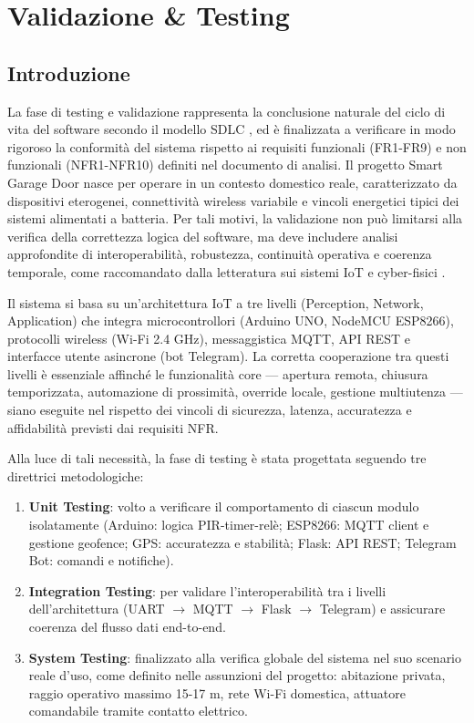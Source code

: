 \chapter{Validazione \& Testing}

\section{Introduzione}
La fase di testing e validazione rappresenta la conclusione naturale del ciclo di vita del software secondo il modello SDLC \cite{Pressman2019}, ed è finalizzata a verificare in modo rigoroso la conformità del sistema rispetto ai requisiti funzionali (FR1-FR9) e non funzionali (NFR1-NFR10) definiti nel documento di analisi.
Il progetto Smart Garage Door nasce per operare in un contesto domestico reale, caratterizzato da dispositivi eterogenei, connettività wireless variabile e vincoli energetici tipici dei sistemi alimentati a batteria. Per tali motivi, la validazione non può limitarsi alla verifica della correttezza logica del software, ma deve includere analisi approfondite di interoperabilità, robustezza, continuità operativa e coerenza temporale, come raccomandato dalla letteratura sui sistemi IoT e cyber-fisici \cite{Gubbi2013, Lee2015, Tang2022}.

Il sistema si basa su un'architettura IoT a tre livelli (Perception, Network, Application) che integra microcontrollori (Arduino UNO, NodeMCU ESP8266), protocolli wireless (Wi-Fi 2.4 GHz), messaggistica MQTT, API REST e interfacce utente asincrone (bot Telegram). La corretta cooperazione tra questi livelli è essenziale affinché le funzionalità core — apertura remota, chiusura temporizzata, automazione di prossimità, override locale, gestione multiutenza — siano eseguite nel rispetto dei vincoli di sicurezza, latenza, accuratezza e affidabilità previsti dai requisiti NFR.

Alla luce di tali necessità, la fase di testing è stata progettata seguendo tre direttrici metodologiche:
\begin{enumerate}
    \item \textbf{Unit Testing}: volto a verificare il comportamento di ciascun modulo isolatamente (Arduino: logica PIR-timer-relè; ESP8266: MQTT client e gestione geofence; GPS: accuratezza e stabilità; Flask: API REST; Telegram Bot: comandi e notifiche).
    \item \textbf{Integration Testing}: per validare l'interoperabilità tra i livelli dell'architettura (UART $\rightarrow$ MQTT $\rightarrow$ Flask $\rightarrow$ Telegram) e assicurare coerenza del flusso dati end-to-end.
    \item \textbf{System Testing}: finalizzato alla verifica globale del sistema nel suo scenario reale d'uso, come definito nelle assunzioni del progetto: abitazione privata, raggio operativo massimo 15-17 m, rete Wi-Fi domestica, attuatore comandabile tramite contatto elettrico.
\end{enumerate}

